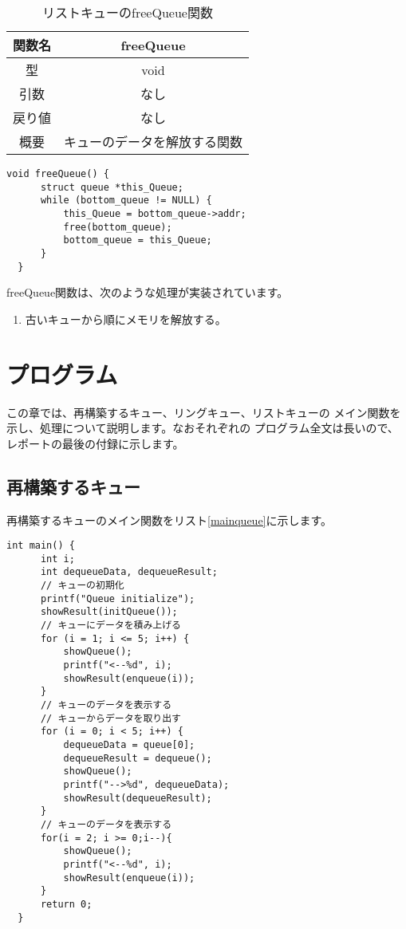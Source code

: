 \documentclass[a4j]{jarticle}
\begin{document}
\begin{table}[htbp]
  \centering
  \caption{リストキューのfreeQueue関数}
  \label{table:freeQueue}
  \begin{tabular}{|c|c|}
    \hline
    関数名 & freeQueue      \\
    \hline
    型   & void           \\
    \hline
    引数  & なし             \\
    \hline
    戻り値 & なし             \\
    \hline
    概要  & キューのデータを解放する関数 \\
    \hline
  \end{tabular}
\end{table}

\begin{lstlisting}[caption=リストキューのfreeQueue関数の実装,label=listfreeQueue]
  void freeQueue() {
      struct queue *this_Queue;
      while (bottom_queue != NULL) {
          this_Queue = bottom_queue->addr;
          free(bottom_queue);
          bottom_queue = this_Queue;
      }
  }
\end{lstlisting}

freeQueue関数は、次のような処理が実装されています。
\begin{enumerate}
  \item 古いキューから順にメモリを解放する。
\end{enumerate}

\section{プログラム}
この章では、再構築するキュー、リングキュー、リストキューの
メイン関数を示し、処理について説明します。なおそれぞれの
プログラム全文は長いので、レポートの最後の付録に示します。

\subsection{再構築するキュー}
再構築するキューのメイン関数をリスト\ref{mainqueue}に示します。

\begin{lstlisting}[caption=再構築するキューのメイン関数,label=mainqueue]
  int main() {
      int i;
      int dequeueData, dequeueResult;
      // キューの初期化
      printf("Queue initialize");
      showResult(initQueue());
      // キューにデータを積み上げる
      for (i = 1; i <= 5; i++) {
          showQueue();
          printf("<--%d", i);
          showResult(enqueue(i));
      }
      // キューのデータを表示する
      // キューからデータを取り出す
      for (i = 0; i < 5; i++) {
          dequeueData = queue[0];
          dequeueResult = dequeue();
          showQueue();
          printf("-->%d", dequeueData);
          showResult(dequeueResult);
      }
      // キューのデータを表示する
      for(i = 2; i >= 0;i--){
          showQueue();
          printf("<--%d", i);
          showResult(enqueue(i));
      }
      return 0;
  }
\end{lstlisting}
\end{document}
